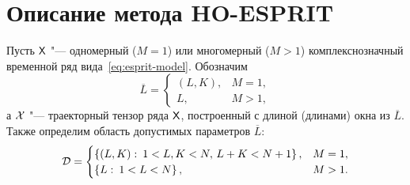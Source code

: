 \documentclass[specialist,
  substylefile=spbu_report.rtx,
subf,href,colorlinks=true, 12pt]{disser}
\theoremstyle{plain}
\theoremstyle{definition}
\theoremstyle{remark}
\begin{document}
\section{Описание метода HO-ESPRIT}\label{sec:Tensor-esprit-description}
Пусть $\mathsf{X}$ "--- одномерный ($M=1$) или многомерный ($M>1$)
комплекснозначный временной ряд
вида~\eqref{eq:esprit-model}.
Обозначим
\[
  \overline{L} =
  \begin{cases}
    (L, K), & M=1,\\
    L, & M>1,
  \end{cases}
\]
а $\mathcal{X}$ "--- траекторный тензор ряда $\mathsf{X}$, построенный с длиной
(длинами) окна из $\overline{L}$.
Также определим область допустимых параметров $\overline{L}$:
\[
  \mathcal{D} =
  \begin{cases}
    \left\{ (L, K):\: 1< L,K <N,\, L + K < N + 1 \right\}, & M = 1,\\
    \left\{ L:\: 1< L <N \right\}, & M > 1.
  \end{cases}
\]
\end{document}
